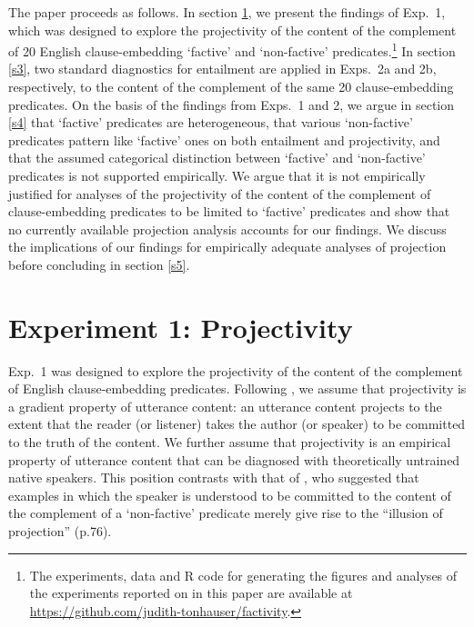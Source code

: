 \documentclass[11pt,fleqn]{article}
\newcommand{\6}{\mbox{$[\hspace*{-.6mm}[$}}
\newcommand{\9}{\mbox{$]\hspace*{-.6mm}]$}}
\begin{document}
The paper proceeds as follows. In section \ref{s2}, we present the findings of Exp.~1, which was designed to explore the projectivity of the content of the complement of 20 English clause-embedding `factive' and `non-factive' predicates.\footnote{\label{f-github}The
experiments, data and R code for generating the figures and analyses of the experiments reported on in this paper are available at \url{https://github.com/judith-tonhauser/factivity}.}  In section \ref{s3}, two standard diagnostics for entailment are applied in Exps.~2a and 2b, respectively, to the content of the complement of the same 20 clause-embedding predicates. On the basis of the findings from Exps.~1 and 2, we argue in section \ref{s4} that `factive' predicates are heterogeneous, that various `non-factive' predicates pattern like `factive' ones on both entailment and projectivity, and that the assumed categorical distinction between `factive' and `non-factive' predicates is not supported empirically. We argue that it is not empirically justified for analyses of the projectivity of the content of the complement of clause-embedding predicates to be limited to `factive' predicates and show that no currently available projection analysis accounts for our findings. We discuss the implications of our findings for empirically adequate analyses of projection before concluding in section \ref{s5}.



\section{Experiment 1: Projectivity}\label{s2}

Exp.~1 was designed to explore the projectivity of the content of the complement of English clause-embedding predicates. Following \citealt{tbd-variability}, we assume that projectivity is a gradient property of utterance content: an utterance content projects to the extent that the reader (or listener) takes the author (or speaker) to be committed to the truth of the content. We further assume that projectivity is an empirical property of utterance content that can be diagnosed with theoretically untrained native speakers. This position contrasts with that of \citet{anand-hacquard2014}, who suggested that examples in which the speaker is understood to be committed to the content of the complement of a `non-factive' predicate merely give rise to the ``illusion of projection'' (p.76). 
\end{document}
